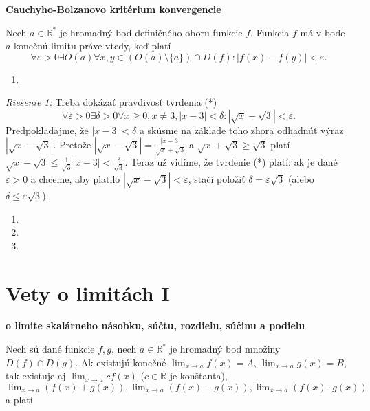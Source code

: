 \begin{veta}
\textbf{Cauchyho-Bolzanovo kritérium konvergencie}

Nech $a \in \mathbb{R^*}$ je hromadný bod definičného oboru funkcie $f$. Funkcia $f$ má v bode $a$ konečnú limitu práve vtedy, keď platí 
$$\forall \varepsilon > 0 \exists O(a) \forall x,y \in (O(a) \setminus \{ a \}) \cap D(f): |f(x)-f(y)|<\varepsilon.$$
\end{veta}

\begin{enumerate}[resume]
	\item {}
\end{enumerate}

\textit{Riešenie 1:}
Treba dokázať pravdivosť tvrdenia (*)
$$\forall \varepsilon > 0 \exists \delta > 0 \forall x \geq 0, x \neq 3, |x-3|< \delta : |\sqrt{x}-\sqrt{3}|< \varepsilon.$$
Predpokladajme, že $|x-3|<\delta$ a skúsme na základe toho zhora odhadnúť výraz $|\sqrt{x}-\sqrt{3}|$. Pretože $|\sqrt{x}-\sqrt{3}|=\frac{|x-3|}{\sqrt{x}+\sqrt{3}}$ a $\sqrt{x}+\sqrt{3} \geq \sqrt{3}$ platí $\sqrt{x}-\sqrt{3} \leq \frac{1}{\sqrt{3}}|x-3|<\frac{\delta}{\sqrt{3}}$. Teraz už vidíme, že tvrdenie (*) platí: ak je dané $\varepsilon > 0$ a chceme, aby platilo $|\sqrt{x}-\sqrt{3}|<\varepsilon$, stačí položiť $\delta=\varepsilon \sqrt{3}$ (alebo $\delta \leq \varepsilon \sqrt{3}$).

\begin{enumerate}[resume]
	\item {}
	\item {}
	\item {}
\end{enumerate}

\section{Vety o limitách I}
\begin{veta}
\textbf{o limite skalárneho násobku, súčtu, rozdielu, súčinu a podielu}

Nech sú dané funkcie $f,g$, nech $a \in \mathbb{R^*}$ je hromadný bod množiny $D(f) \cap D(g)$. Ak existujú konečné $\lim_{x \rightarrow a} f(x)=A$, $\lim_{x \rightarrow a} g(x)=B$, tak existuje aj $\lim_{x \rightarrow a} cf(x)$ ($c \in \mathbb{R}$ je konštanta), $\lim_{x \rightarrow a} (f(x)+g(x)),\lim_{x \rightarrow a} (f(x)-g(x)),\lim_{x \rightarrow a} (f(x) \cdot g(x))$ a platí 
\end{veta}

